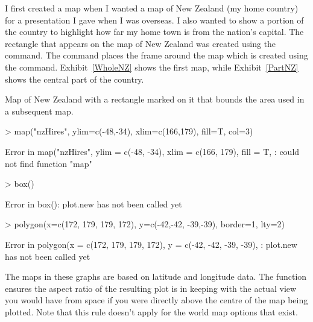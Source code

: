 I first created a map when I wanted a map of New Zealand (my home country) for a presentation I gave when I was overseas. I also wanted to show a portion of the country to highlight how far my home town is from the nation's capital. The rectangle that appears on the map of New Zealand was created using the  command. The  command places the frame around the map which is created using the  command. Exhibit~\ref{WholeNZ} shows the first map, while Exhibit~\ref{PartNZ} shows the central part of the country. 
\begin{exhibit} 
\caption{Map of New Zealand with a rectangle marked on it that bounds the area used in a subsequent map.} 
\label{WholeNZ} 
\begin{center} 

\begin{Schunk}
\begin{Sinput}
> map("nzHires", ylim=c(-48,-34), xlim=c(166,179), fill=T, col=3) 
\end{Sinput}
\begin{Soutput}
Error in map("nzHires", ylim = c(-48, -34), xlim = c(166, 179), fill = T, : could not find function "map"
\end{Soutput}
\begin{Sinput}
> box() 
\end{Sinput}
\begin{Soutput}
Error in box(): plot.new has not been called yet
\end{Soutput}
\begin{Sinput}
> polygon(x=c(172, 179, 179, 172), y=c(-42,-42, -39,-39), border=1, lty=2) 
\end{Sinput}
\begin{Soutput}
Error in polygon(x = c(172, 179, 179, 172), y = c(-42, -42, -39, -39), : plot.new has not been called yet
\end{Soutput}
\end{Schunk}

\end{center} 
\end{exhibit} 
 
The maps in these graphs are based on latitude and longitude data. The  function ensures the aspect ratio of the resulting plot is in keeping with the actual view you would have from space if you were directly above the centre of the map being plotted. Note that this rule doesn't apply for the world map options that exist. 
 
